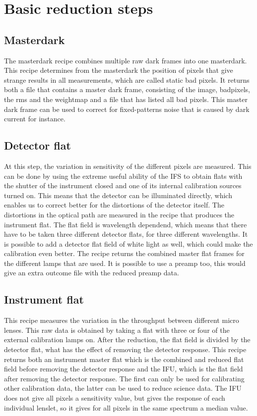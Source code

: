 \documentclass[twoside,single]{lion-msc}
\begin{document}
\section{Basic reduction steps}
\subsection{Masterdark}
The masterdark recipe combines multiple raw dark frames into one masterdark. This recipe determines from the masterdark the position of pixels that give strange results in all measurements, which are called static bad pixels. It returns both a file that contains a master dark frame, consisting of the image, badpixels, the rms and the weightmap and a file that has listed all bad pixels. This master dark frame can be used to correct for fixed-patterns noise that is caused by dark current for instance.

\subsection{Detector flat}
At this step, the variation in sensitivity of the different pixels are measured. This can be done by using the extreme useful ability of the IFS to obtain flats with the shutter of the instrument closed and one of its internal calibration sources turned on. This means that the detector can be illuminated directly, which enables us to correct better for the distortions of the detector itself. The distortions in the optical path are measured in the recipe that produces the instrument flat. The flat field is wavelength dependend, which means that there have to be taken three different detector flats, for three different wavelengths. It is possible to add a detector flat field of white light as well, which could make the calibration even better. The recipe returns the combined master flat frames for the different lamps that are used. It is possible to use a preamp too, this would give an extra outcome file with the reduced preamp data.

\subsection{Instrument flat}
This recipe measures the variation in the throughput between different micro lenses. This raw data is obtained by taking a flat with three or four of the external calibration lamps on. After the reduction, the flat field is divided by the detector flat, what has the effect of removing the detector response. This recipe returns both an instrument master flat which is the combined and reduced flat field before removing the detector response and the IFU, which is the flat field after removing the detector response. The first can only be used for calibrating other calibration data, the latter can be used to reduce science data. The IFU does not give all pixels a sensitivity value, but gives the response of each individual lenslet, so it gives for all pixels in the same spectrum a median value.
\end{document}
